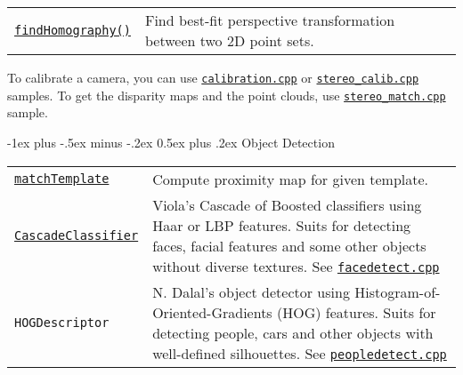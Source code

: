 \documentclass[10pt,landscape]{article}
\makeatletter
\renewcommand{\section}{\@startsection{section}{1}{0mm}%
                                {-1ex plus -.5ex minus -.2ex}%
                                {0.5ex plus .2ex}%
                                {\normalfont\large\bfseries}}
\makeatother
\begin{document}
\begin{multicols}{3}
\begin{tabular}{@{}p{\the\MyLen}%
                @{}p{\linewidth-\the\MyLen}@{}}
\texttt{\href{http://opencv.itseez.com/modules/calib3d/doc/camera_calibration_and_3d_reconstruction.html\#findhomography}{findHomography()}} & Find best-fit perspective transformation between two 2D point sets. \\

\end{tabular}

To calibrate a camera, you can use \texttt{\href{http://code.opencv.org/svn/opencv/trunk/opencv/samples/cpp/calibration.cpp}{calibration.cpp}} or
\texttt{\href{http://code.opencv.org/svn/opencv/trunk/opencv/samples/cpp/stereo\_calib.cpp}{stereo\_calib.cpp}} samples.
To get the disparity maps and the point clouds, use
\texttt{\href{http://code.opencv.org/svn/opencv/trunk/opencv/samples/cpp/stereo\_match.cpp}{stereo\_match.cpp}} sample.

\section{Object Detection}

\begin{tabular}{@{}p{\the\MyLen}%
                @{}p{\linewidth-\the\MyLen}@{}}
                \texttt{\href{http://opencv.itseez.com/modules/imgproc/doc/object_detection.html\#matchtemplate}{matchTemplate}} & Compute proximity map for given template.\\

\texttt{\href{http://opencv.itseez.com/modules/objdetect/doc/cascade_classification.html\#cascadeclassifier}{CascadeClassifier}} & Viola's Cascade of Boosted classifiers using Haar or LBP features. Suits for detecting faces, facial features and some other objects without diverse textures. See \texttt{\href{http://code.opencv.org/svn/opencv/trunk/opencv/samples/c/facedetect.cpp}{facedetect.cpp}}\\

\texttt{{HOGDescriptor}} & N. Dalal's object detector using Histogram-of-Oriented-Gradients (HOG) features. Suits for detecting people, cars and other objects with well-defined silhouettes. See \texttt{\href{http://code.opencv.org/svn/opencv/trunk/opencv/samples/cpp/peopledetect.cpp}{peopledetect.cpp}}\\

\end{tabular}

%    
%    
%        

\end{multicols}
\end{document}
